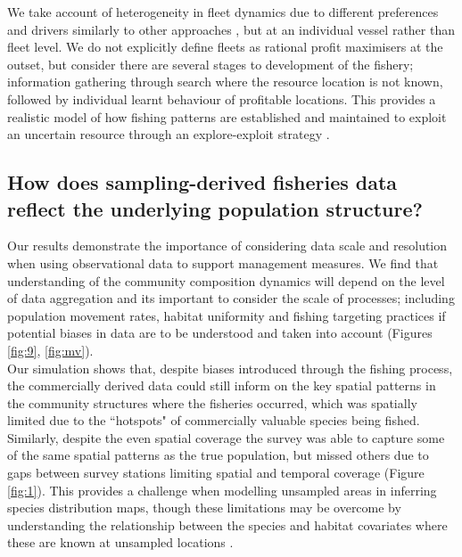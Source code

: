 \documentclass[review]{elsarticle}
\begin{document}
We take account of heterogeneity in fleet dynamics due to different preferences
and drivers similarly to other approaches \citep{Fulton2011}, but at an
individual vessel rather than fleet level. We do not explicitly define fleets
as rational profit maximisers at the outset, but consider there are several
stages to development of the fishery; information gathering through search
where the resource location is not known, followed by individual learnt
behaviour of profitable locations.  This provides a realistic model of how
fishing patterns are established and maintained to exploit an uncertain
resource through an explore-exploit strategy \citep{Mangel1983, Bailey2018}. 

\subsection{How does sampling-derived fisheries data reflect the underlying
	population structure?}


Our results demonstrate the importance of considering data scale and resolution
when using observational data to support management measures. We find that
understanding of the community composition dynamics will depend on the level of
data aggregation and its important to consider the scale of processes;
including population movement rates, habitat uniformity and fishing targeting
practices if potential biases in data are to be understood and taken into
account (Figures \ref{fig:9}, \ref{fig:mv}). \\

Our simulation shows that, despite biases introduced through the fishing
process, the commercially derived data could still inform on the key spatial
patterns in the community structures where the fisheries occurred, which was
spatially limited due to the ``hotspots" of commercially valuable species being
fished. Similarly, despite the even spatial coverage the survey was able to
capture some of the same spatial patterns as the true population, but missed
others due to gaps between survey stations limiting spatial and temporal
coverage (Figure \ref{fig:1}). This provides a challenge when
modelling unsampled areas in inferring species distribution maps, though these
limitations may be overcome by understanding the relationship between the
species and habitat covariates where these are known at unsampled locations
\citep{Robinson2011}. \\ 
\end{document}

